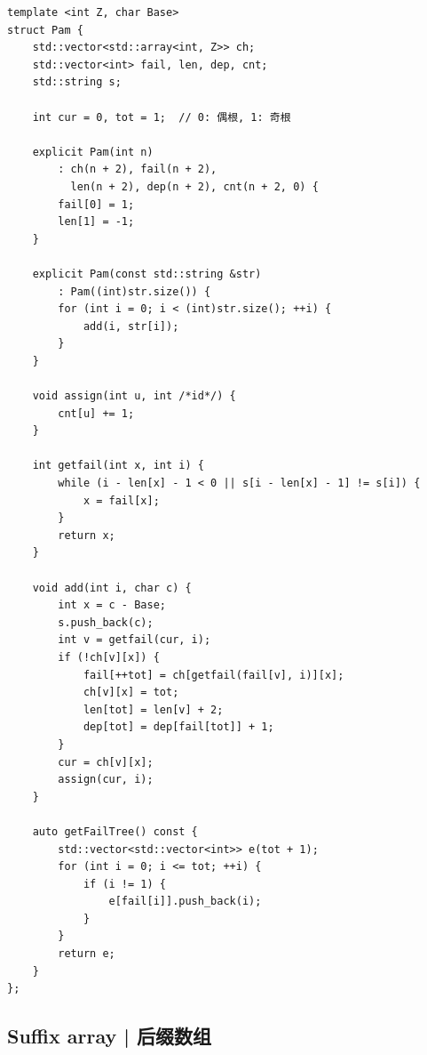     \begin{lstlisting}
template <int Z, char Base>
struct Pam {
    std::vector<std::array<int, Z>> ch;
    std::vector<int> fail, len, dep, cnt;
    std::string s;

    int cur = 0, tot = 1;  // 0: 偶根, 1: 奇根

    explicit Pam(int n)
        : ch(n + 2), fail(n + 2),
          len(n + 2), dep(n + 2), cnt(n + 2, 0) {
        fail[0] = 1;
        len[1] = -1;
    }

    explicit Pam(const std::string &str)
        : Pam((int)str.size()) {
        for (int i = 0; i < (int)str.size(); ++i) {
            add(i, str[i]);
        }
    }

    void assign(int u, int /*id*/) {
        cnt[u] += 1;
    }

    int getfail(int x, int i) {
        while (i - len[x] - 1 < 0 || s[i - len[x] - 1] != s[i]) {
            x = fail[x];
        }
        return x;
    }

    void add(int i, char c) {
        int x = c - Base;
        s.push_back(c);
        int v = getfail(cur, i);
        if (!ch[v][x]) {
            fail[++tot] = ch[getfail(fail[v], i)][x];
            ch[v][x] = tot;
            len[tot] = len[v] + 2;
            dep[tot] = dep[fail[tot]] + 1;
        }
        cur = ch[v][x];
        assign(cur, i);
    }

    auto getFailTree() const {
        std::vector<std::vector<int>> e(tot + 1);
        for (int i = 0; i <= tot; ++i) {
            if (i != 1) {
                e[fail[i]].push_back(i);
            }
        }
        return e;
    }
};
    \end{lstlisting}

\subsection{Suffix array | 后缀数组}


